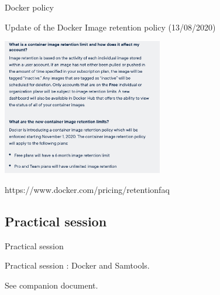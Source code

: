 \begin{frame}{Docker policy}

\centering Update of the Docker Image retention policy (13/08/2020)

\includegraphics[width=7cm]{02_encapsulation/images/docker_image_retention_policy.png}

https://www.docker.com/pricing/retentionfaq

\end{frame}

\subsection{Practical session}

\begin{frame}{Practical session}

Practical session : Docker and Samtools.

See companion document.

\end{frame}

